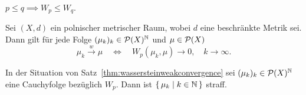 \documentclass[../main/main.tex]{subfiles}
\begin{document}
	\begin{Bemerkung}
		$p \leq q \implies W_p \leq W_q$.
	\end{Bemerkung}

	\begin{Satz}
		\label{thm:wassersteinweakconvergence}
		Sei $(X, d)$ ein polnischer metrischer Raum, wobei $d$ eine beschränkte Metrik sei. Dann gilt
		für jede Folge $(\mu_k)_k \in \mathcal{P}(X)^{\mathbb{N}}$ und $\mu \in \mathcal{P}(X)$
		\[ \mu_k \xrightarrow{w} \mu \quad \iff \quad W_p(\mu_k, \mu) \to 0, \quad k \to \infty \text{.} \]
	\end{Satz}

	\begin{Hilfssatz}
		In der Situation von Satz~\ref{thm:wassersteinweakconvergence} sei $(\mu_k)_k \in \mathcal{P}(X)^{\mathbb{N}}$ eine Cauchyfolge
		bezüglich $W_p$. Dann ist $\left\{\, \mu_k \; \middle| \; k \in \mathbb{N} \,\right\}$ straff.
	\end{Hilfssatz}
\end{document}
